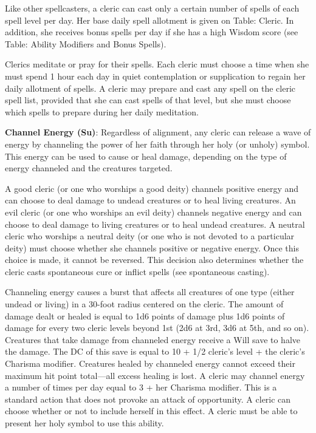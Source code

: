 Like other spellcasters, a cleric can cast only a certain number of spells of each spell level per day. Her base
    daily spell allotment is given on Table: Cleric. In addition, she receives bonus spells per day if she has a
    high Wisdom score (see Table: Ability Modifiers and Bonus Spells). 
    
Clerics meditate or pray for their spells. Each cleric must choose a time when she must spend 1 hour each day in 
    quiet contemplation or supplication to regain her daily allotment of spells. A cleric may prepare and cast any 
    spell on the cleric spell list, provided that she can cast spells of that level, but she must choose which spells
    to prepare during her daily meditation.

\textbf{Channel Energy (Su)}: Regardless of alignment, any cleric can release a wave of energy by channeling the
power of her faith through her holy (or unholy) symbol. This energy can be used to cause or heal damage, depending
on the type of energy channeled and the creatures targeted. 

A good cleric (or one who worships a good deity) channels positive energy and can choose to deal damage to undead
creatures or to heal living creatures. An evil cleric (or one who worships an evil deity) channels negative energy
and can choose to deal damage to living creatures or to heal undead creatures. A neutral cleric who worships a
neutral deity (or one who is not devoted to a particular deity) must choose whether she channels positive or
negative energy. Once this choice is made, it cannot be reversed. This decision also determines whether the
cleric casts spontaneous cure or inflict spells (see spontaneous casting). 

Channeling energy causes a burst that affects all creatures of one type (either undead or living) in a 30-foot 
radius centered on the cleric. The amount of damage dealt or healed is equal to 1d6 points of damage plus 1d6 
points of damage for every two cleric levels beyond 1st (2d6 at 3rd, 3d6 at 5th, and so on). Creatures that take 
damage from channeled energy receive a Will save to halve the damage. The DC of this save is equal to 10 + 1/2 
cleric's level + the cleric's Charisma modifier. Creatures healed by channeled energy cannot exceed their maximum
hit point total---all excess healing is lost. A cleric may channel energy a number of times per day equal to 3 + 
her Charisma modifier. This is a standard action that does not provoke an attack of opportunity. A cleric can 
choose whether or not to include herself in this effect. A cleric must be able to present her holy symbol to 
use this ability. 
				
